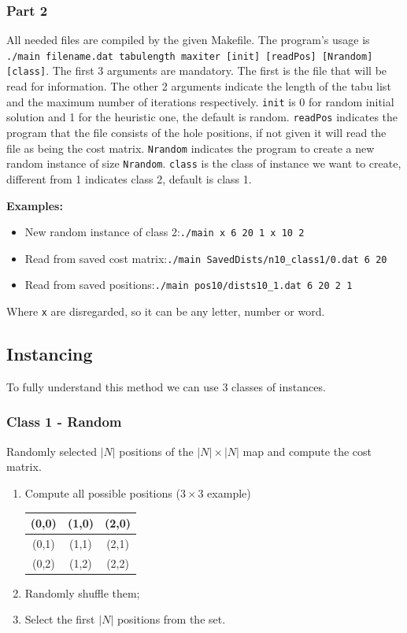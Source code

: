 \documentclass[a4paper,12pt]{article}
\begin{document}
			\subsubsection{Part 2}
				All needed files are compiled by the given Makefile.
				The program's usage is \texttt{./main filename.dat tabulength maxiter [init] [readPos] [Nrandom] [class]}.
				The first 3 arguments are mandatory. 
				The first is the file that will be read for information.
				The other 2 arguments indicate the length of the tabu list and the maximum number of iterations respectively.
				\texttt{init} is 0 for random initial solution and 1 for the heuristic one, the default is random.
				\texttt{readPos} indicates the program that the file consists of the hole positions, if not given it will read the file as being the cost matrix.
				\texttt{Nrandom} indicates the program to create a new random instance of size \texttt{Nrandom}.
				\texttt{class} is the class of instance we want to create, different from 1 indicates class 2, default is class 1.
				
				\textbf{Examples:}
				\begin{itemize}
					\item New random instance of class 2:\texttt{./main x 6 20 1 x 10 2}
					\item Read from saved cost matrix:\texttt{./main SavedDists/n10\_class1/0.dat 6 20}
					\item Read from saved positions:\texttt{./main pos10/dists10\_1.dat 6 20 2 1}
				\end{itemize}
				Where \texttt{x} are disregarded, so it can be any letter, number or word.
					
		
		\subsection{Instancing}
			To fully understand this method we can use 3 classes of instances.
			
			\subsubsection{Class 1 - Random}
				Randomly selected $ |N| $ positions of the $ |N| \times |N| $ map and compute the cost matrix.
				
				\begin{enumerate}
					\item Compute all possible positions ($ 3\times3 $ example) \\
					\begin{table}[H]
						\centering
					\begin{tabular}{|c|c|c|}
						\hline
						(0,0) & (1,0) & (2,0)  \\ \hline
						(0,1) & (1,1) & (2,1) \\ \hline
						(0,2) & (1,2) & (2,2) \\ \hline
					\end{tabular}
				\end{table}
					\item Randomly shuffle them;
					\item Select the first $ |N| $ positions from the set.
				\end{enumerate}
				
\end{document}
